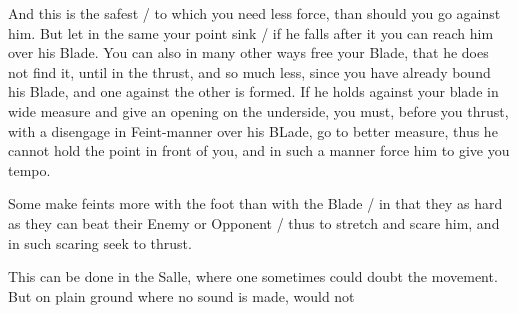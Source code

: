 And this is the safest / to which you need less force, than should you
go against him. But let in the same your point sink / if he falls
after it you can reach him over his Blade. You can also in many other
ways free your Blade, that he does not find it, until in the thrust,
and so much less, since you have already bound his Blade, and one
against the other is formed. If he holds against your blade in wide
measure and give an opening on the underside, you must, before you
thrust, with a disengage in Feint-manner over his BLade, go to better
measure, thus he cannot hold the point in front of you, and in such a
manner force him to give you tempo.



Some make feints more with the foot than with the Blade / in that they
as hard as they can beat their Enemy or Opponent / thus to stretch and
scare him, and in such scaring seek to thrust.


This can be done in the Salle, where one sometimes could doubt the
movement. But on plain ground where no sound is made, would not